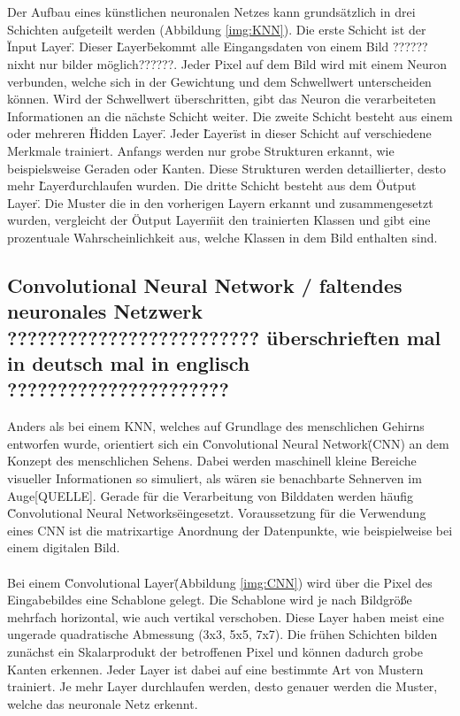 \documentclass[a4paper,12pt,oneside]{article}
\begin{document}
\\
\\
Der Aufbau eines künstlichen neuronalen Netzes kann grundsätzlich in drei Schichten aufgeteilt werden (Abbildung \ref{img:KNN}). Die erste Schicht ist der \"Input Layer\". Dieser \"Layer\" bekommt alle Eingangsdaten von einem Bild ??????nixht nur bilder möglich??????. Jeder Pixel auf dem Bild wird mit einem Neuron verbunden, welche sich in der Gewichtung und dem Schwellwert unterscheiden können. Wird der Schwellwert überschritten, gibt das Neuron die verarbeiteten Informationen an die nächste Schicht weiter. Die zweite Schicht besteht aus einem oder mehreren \"Hidden Layer\". Jeder \"Layer\" ist in dieser Schicht auf verschiedene Merkmale trainiert. Anfangs werden nur grobe Strukturen erkannt, wie beispielsweise Geraden oder Kanten. Diese Strukturen werden detaillierter, desto mehr \"Layer\" durchlaufen wurden. Die dritte Schicht besteht aus dem \"Output Layer\". Die Muster die in den vorherigen Layern erkannt und zusammengesetzt wurden, vergleicht der \"Output Layer\" mit den trainierten Klassen und gibt eine prozentuale Wahrscheinlichkeit aus, welche Klassen in dem Bild enthalten sind.


  \subsection{Convolutional Neural Network / faltendes neuronales Netzwerk ????????????????????????? überschrieften mal in deutsch mal in englisch  ??????????????????????}
Anders als bei einem KNN, welches auf Grundlage des menschlichen Gehirns entworfen wurde, orientiert sich ein \"Convolutional Neural Network\" (CNN) an dem Konzept des menschlichen Sehens. Dabei werden maschinell kleine Bereiche visueller Informationen so simuliert, als wären sie benachbarte Sehnerven im Auge[QUELLE]. Gerade für die Verarbeitung von Bilddaten werden häufig \"Convolutional Neural Networks\" eingesetzt. Voraussetzung für die Verwendung eines CNN ist die matrixartige Anordnung der Datenpunkte, wie beispielweise bei einem digitalen Bild.
\\
\\
Bei einem \"Convolutional Layer\" (Abbildung \ref{img:CNN}) wird über die Pixel des Eingabebildes eine Schablone gelegt. Die Schablone wird je nach Bildgröße mehrfach horizontal, wie auch vertikal verschoben. Diese Layer haben meist eine ungerade quadratische Abmessung (3x3, 5x5, 7x7). Die frühen Schichten bilden zunächst ein Skalarprodukt der betroffenen Pixel und können dadurch grobe Kanten erkennen. Jeder Layer ist dabei auf eine bestimmte Art von Mustern trainiert. Je mehr Layer durchlaufen werden, desto genauer werden die Muster, welche das neuronale Netz erkennt.
\end{document}
